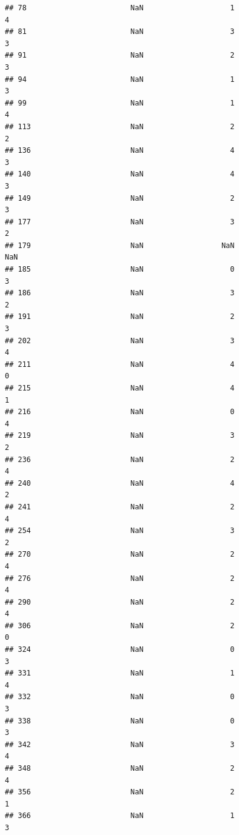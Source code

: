 \documentclass[
]{article}
\begin{document}
\begin{verbatim}
## 78                        NaN                    1                    4
## 81                        NaN                    3                    3
## 91                        NaN                    2                    3
## 94                        NaN                    1                    3
## 99                        NaN                    1                    4
## 113                       NaN                    2                    2
## 136                       NaN                    4                    3
## 140                       NaN                    4                    3
## 149                       NaN                    2                    3
## 177                       NaN                    3                    2
## 179                       NaN                  NaN                  NaN
## 185                       NaN                    0                    3
## 186                       NaN                    3                    2
## 191                       NaN                    2                    3
## 202                       NaN                    3                    4
## 211                       NaN                    4                    0
## 215                       NaN                    4                    1
## 216                       NaN                    0                    4
## 219                       NaN                    3                    2
## 236                       NaN                    2                    4
## 240                       NaN                    4                    2
## 241                       NaN                    2                    4
## 254                       NaN                    3                    2
## 270                       NaN                    2                    4
## 276                       NaN                    2                    4
## 290                       NaN                    2                    4
## 306                       NaN                    2                    0
## 324                       NaN                    0                    3
## 331                       NaN                    1                    4
## 332                       NaN                    0                    3
## 338                       NaN                    0                    3
## 342                       NaN                    3                    4
## 348                       NaN                    2                    4
## 356                       NaN                    2                    1
## 366                       NaN                    1                    3

\end{verbatim}
\end{document}

